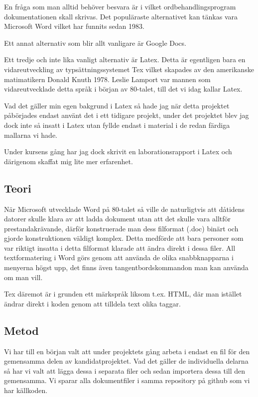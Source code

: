 En fråga som man alltid behöver besvara är i vilket ordbehandlingsprogram dokumentationen skall skrivas. Det populäraste 
alternativet kan tänkas vara Microsoft Word vilket har funnits sedan 1983\cite{leslie_lamport}.

Ett annat alternativ som blir allt vanligare är Google Docs.

Ett tredje och inte lika vanligt alternativ är Latex. Detta är egentligen bara en vidareutveckling av typsättningssystemet 
Tex vilket skapades av den amerikanske matimatikern Donald Knuth 1978\cite{donald_knuth}. Leslie Lamport var mannen som vidareutvecklade detta 
språk i början av 80-talet, till det vi idag kallar Latex\cite{latex_ursprung}.

Vad det gäller min egen bakgrund i Latex så hade jag när detta projektet påbörjades endast använt det i ett tidigare projekt, under det projektet
blev jag dock inte så insatt i Latex utan fyllde endast i material i de redan färdiga mallarna vi hade.

Under kursens gång har jag dock skrivit en laborationsrapport i Latex och därigenom skaffat mig lite mer erfarenhet.


\subsection{Teori}
När Microsoft utvecklade Word på 80-talet så ville de naturligtvis att dåtidens datorer skulle klara av att ladda 
dokument utan att det skulle vara alltför prestandakrävande, därför konstruerade man dess filformat (.doc) binärt och gjorde konstruktionen 
väldigt komplex. Detta medförde att bara personer som var riktigt insatta i detta filformat klarade att ändra direkt i dessa filer.
All textformatering i Word görs genom att använda de olika snabbknapparna i menyerna högst upp, det finns även tangentbordskommandon man kan
använda om man vill.

Tex däremot är i grunden ett märkspråk liksom t.ex. HTML, där man istället ändrar direkt i koden genom att tilldela text olika taggar.



\subsection{Metod}
Vi har till en början valt att under projektets gång arbeta i endast en fil för den gemensamma delen av kandidatprojektet. Vad det gäller 
de individuella delarna så har vi valt att lägga dessa i separata filer och sedan importera dessa till den gemensamma. Vi 
sparar alla dokumentfiler i samma repository på github som vi har källkoden.


